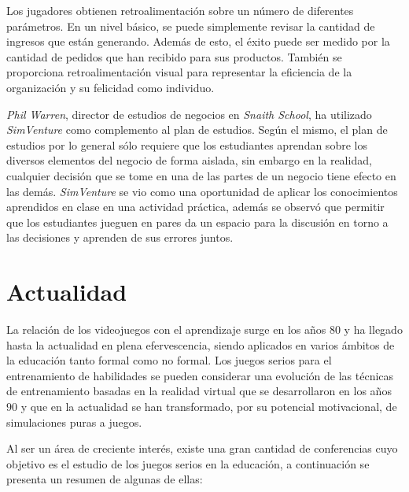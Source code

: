 Los jugadores obtienen retroalimentación sobre un número de diferentes
parámetros. En un nivel básico, se puede simplemente revisar la cantidad de
ingresos que están generando. Además de esto, el éxito puede ser medido por la
cantidad de pedidos que han recibido para sus productos. También se proporciona
retroalimentación visual para representar la eficiencia de la organización y su
felicidad como individuo.

\emph{Phil Warren}, director de estudios de negocios en \emph{Snaith School}, ha
utilizado \emph{SimVenture} como complemento al plan de estudios. Según el
mismo, el plan de estudios por lo general sólo requiere que los estudiantes
aprendan sobre los diversos elementos del negocio de forma aislada, sin embargo
en la realidad, cualquier decisión que se tome en una de las partes de un
negocio tiene efecto en las demás. \emph{SimVenture} se vio como una oportunidad
de aplicar los conocimientos aprendidos en clase en una actividad práctica,
además se observó que permitir que los estudiantes jueguen en pares da un
espacio para la discusión en torno a las decisiones y aprenden de sus errores
juntos\cite{education:games}.

\section{Actualidad}

La relación de los videojuegos con el aprendizaje surge en los años $80$ y ha llegado
hasta la actualidad en plena efervescencia, siendo aplicados en varios 
ámbitos de la educación tanto formal como no formal. Los juegos serios para el
entrenamiento de habilidades se pueden considerar una evolución de las técnicas
de entrenamiento basadas en la realidad virtual que se desarrollaron en los años
$90$ y que en la actualidad se han transformado, por su potencial motivacional,
de simulaciones puras a juegos\cite{videojuegos:gonzaleztardon}.

Al ser un área de creciente interés, existe una gran cantidad de conferencias
cuyo objetivo es el estudio de los juegos serios en la educación, a continuación se presenta un resumen de algunas de ellas:

